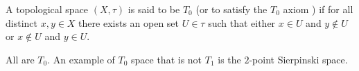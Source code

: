\documentclass{article}
\begin{document}
A topological space $(X,\tau)$ is said to be $T_0$
(or to satisfy the $T_0$ axiom )
if for all distinct $x,y\in X$
there exists an open set $U\in\tau$ such that
either $x\in U$ and $y\notin U$ or $x\notin U$ and $y\in U$.

All  are $T_0$.
An example of $T_0$ space that is not $T_1$
is the $2$-point Sierpinski space.
\end{document}
